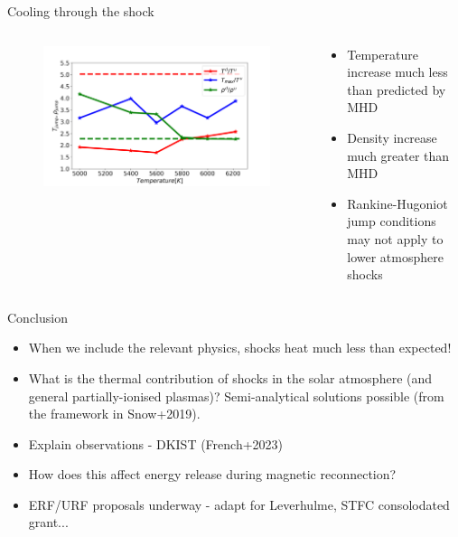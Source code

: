 \documentclass[10pt,aspectratio=169,usenames,dvipsnames]{beamer}
\begin{document}
\begin{frame}{Cooling through the shock}
\begin{columns}
\begin{column}{0.5\textwidth}
\begin{figure}
    \centering
    \includegraphics[width=0.95\linewidth,clip=true,trim=1.2cm 0.3cm 1.6cm 1.8cm]{2023ECRW/Figures/tcompcor_plot.png} \\
\end{figure}
\end{column}
\begin{column}{0.42\textwidth}
\begin{itemize}
    \item Temperature increase much less than predicted by MHD
    \item Density increase much greater than MHD
    \item Rankine-Hugoniot jump conditions may not apply to lower atmosphere shocks
\end{itemize}
\end{column}
\end{columns}
\end{frame}

\begin{frame}{Conclusion}
\begin{itemize}
    \item When we include the relevant physics, shocks heat much less than expected! 
    \item What is the thermal contribution of shocks in the solar atmosphere (and general partially-ionised plasmas)? Semi-analytical solutions possible (from the framework in Snow+2019).
    \item Explain observations - DKIST (French+2023)
    \item How does this affect energy release during magnetic reconnection?
    \item ERF/URF proposals underway - adapt for Leverhulme, STFC consolodated grant...
\end{itemize}
\end{frame}
\end{document}
